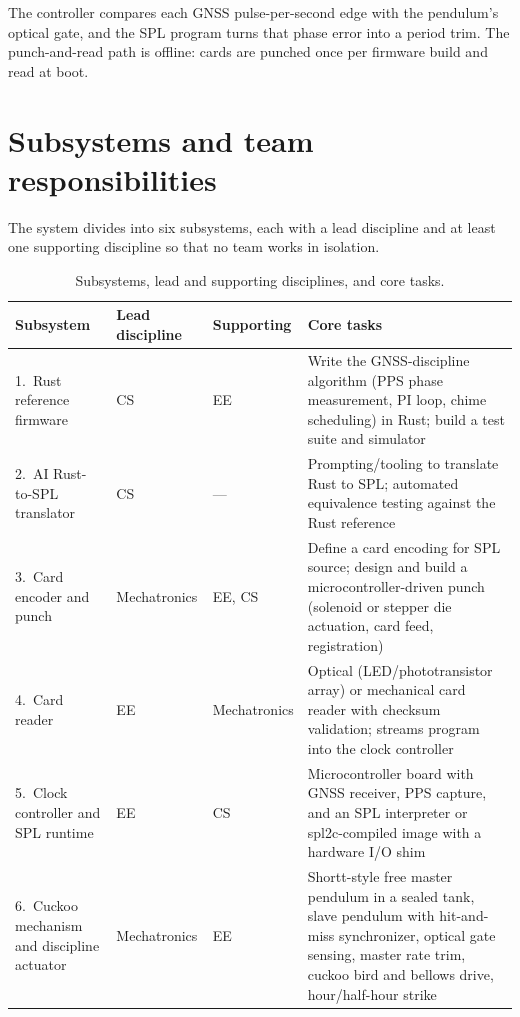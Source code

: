 \documentclass[11pt,letterpaper]{article}
\begin{document}
The controller compares each GNSS pulse-per-second edge with the pendulum's optical gate, and
the SPL program turns that phase error into a period trim. The punch-and-read path is offline:
cards are punched once per firmware build and read at boot.

\section{Subsystems and team responsibilities}

The system divides into six subsystems, each with a lead discipline and at least one
supporting discipline so that no team works in isolation.

\begin{table}[!htbp]
\small
\begin{tabularx}{\textwidth}{@{}L{1.55in}L{0.9in}L{0.85in}Y@{}}
\toprule
\sffamily\bfseries Subsystem & \sffamily\bfseries Lead discipline
  & \sffamily\bfseries Supporting & \sffamily\bfseries Core tasks \\
.~Rust reference firmware & CS & EE &
  Write the GNSS-discipline algorithm (PPS phase measurement, PI loop, chime scheduling) in
  Rust; build a test suite and simulator \\
2.~AI Rust-to-SPL translator & CS & --- &
  Prompting/tooling to translate Rust to SPL; automated equivalence testing against the Rust
  reference \\
3.~Card encoder and punch & Mechatronics & EE, CS &
  Define a card encoding for SPL source; design and build a microcontroller-driven punch
  (solenoid or stepper die actuation, card feed, registration) \\
4.~Card reader & EE & Mechatronics &
  Optical (LED/phototransistor array) or mechanical card reader with checksum validation;
  streams program into the clock controller \\
5.~Clock controller and SPL runtime & EE & CS &
  Microcontroller board with GNSS receiver, PPS capture, and an SPL interpreter or
  spl2c-compiled image with a hardware I/O shim \\
6.~Cuckoo mechanism and discipline actuator & Mechatronics & EE &
  Shortt-style free master pendulum in a sealed tank, slave pendulum with hit-and-miss
  synchronizer, optical gate sensing, master rate trim, cuckoo bird and bellows drive,
  hour/half-hour strike \\
\bottomrule
\end{tabularx}
\caption{Subsystems, lead and supporting disciplines, and core tasks.}
\label{tab:subsystems}
\end{table}
\end{document}
